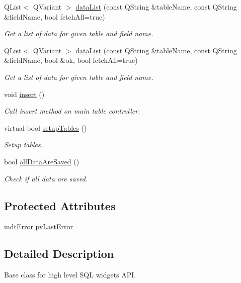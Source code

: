 \begin{DoxyCompactItemize}
Q\-List$<$ Q\-Variant $>$ \hyperlink{classmdt_sql_form_a15a92b2116f2fd3a37344afb66b77a3d}{data\-List} (const Q\-String \&table\-Name, const Q\-String \&field\-Name, bool fetch\-All=true)
\begin{DoxyCompactList}\small\item\em Get a list of data for given table and field name. \end{DoxyCompactList}\item 
Q\-List$<$ Q\-Variant $>$ \hyperlink{classmdt_sql_form_a271b8bc1adac05a36d2db24d0b9cdaff}{data\-List} (const Q\-String \&table\-Name, const Q\-String \&field\-Name, bool \&ok, bool fetch\-All=true)
\begin{DoxyCompactList}\small\item\em Get a list of data for given table and field name. \end{DoxyCompactList}\item 
void \hyperlink{classmdt_sql_form_a2138e4e1236a9b1c002825ddd9e59298}{insert} ()
\begin{DoxyCompactList}\small\item\em Call insert method on main table controller. \end{DoxyCompactList}\item 
virtual bool \hyperlink{classmdt_sql_form_a27fe6e45aa5d4d7782aad9833e6de20b}{setup\-Tables} ()
\begin{DoxyCompactList}\small\item\em Setup tables. \end{DoxyCompactList}\item 
bool \hyperlink{classmdt_sql_form_a1e14cbb5bf04d2eb1c703862a6084031}{all\-Data\-Are\-Saved} ()
\begin{DoxyCompactList}\small\item\em Check if all data are saved. \end{DoxyCompactList}\end{DoxyCompactItemize}
\subsection*{Protected Attributes}
\begin{DoxyCompactItemize}
\item 
\hyperlink{classmdt_error}{mdt\-Error} \hyperlink{classmdt_sql_form_afc24e8dedd1249a29708347fdff560fd}{pv\-Last\-Error}
\end{DoxyCompactItemize}


\subsection{Detailed Description}
Base class for high level S\-Q\-L widgets A\-P\-I. 

